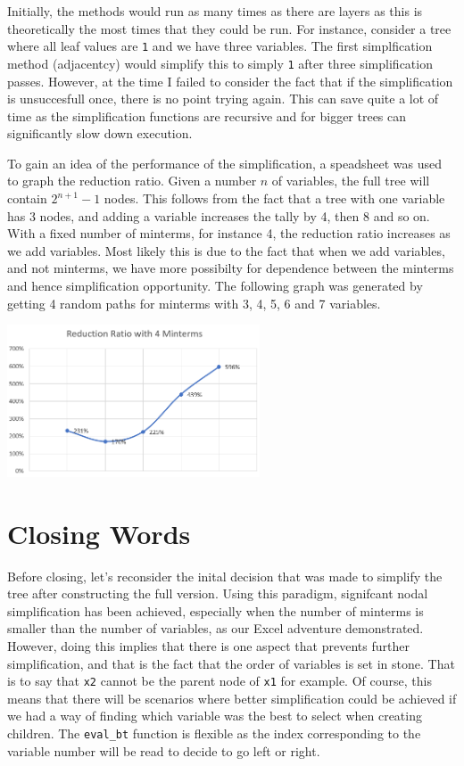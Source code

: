 \documentclass[12pt]{article}
\begin{document}
    Initially, the methods would run as many times as there are layers as this is theoretically the most times that they could be run. For instance, consider a tree where all leaf values are \texttt{1} and we have three variables. The first simplfication method (adjacentcy) would simplify this to simply \texttt{1} after three simplification passes. However, at the time I failed to consider the fact that if the simplification is unsuccesfull once, there is no point trying again. This can save quite a lot of time as the simplification functions are recursive and for bigger trees can significantly slow down execution.
    
    To gain an idea of the performance of the simplification, a speadsheet was used to graph the reduction ratio. Given a number $n$ of variables, the full tree will contain $2^{n+1}-1$ nodes. This follows from the fact that a tree with one variable has 3 nodes, and adding a variable increases the tally by 4, then 8 and so on. With a fixed number of minterms, for instance 4, the reduction ratio increases as we add variables. Most likely this is due to the fact that when we add variables, and not minterms, we have more possibilty for dependence between the minterms and hence simplification opportunity. The following graph was generated by getting 4 random paths for minterms with 3, 4, 5, 6 and 7 variables.
    \begin{center} \vspace{-3ex}
        \includegraphics[width=7.5cm, interpolate]{rsc/stats.png}
        \parbox{\linewidth}{}
    \end{center}

    \section{Closing Words}
    Before closing, let's reconsider the inital decision that was made to simplify the tree after constructing the full version. Using this paradigm, signifcant nodal simplification has been achieved, especially when the number of minterms is smaller than the number of variables, as our Excel adventure demonstrated. However, doing this implies that there is one aspect that prevents further simplification, and that is the fact that the order of variables is set in stone. That is to say that \texttt{x2} cannot be the parent node of \texttt{x1} for example. Of course, this means that there will be scenarios where better simplification could be achieved if we had a way of finding which variable was the best to select when creating children. The \texttt{eval\_bt} function is flexible as the index corresponding to the variable number will be read to decide to go left or right.
\end{document}
